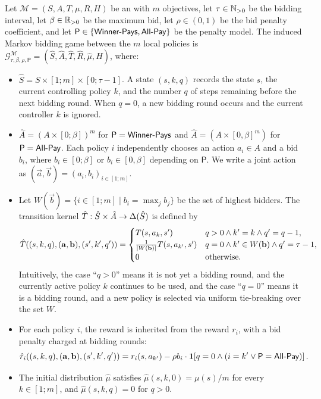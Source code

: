 \begin{definition}\label{def:markov-bidding-game}
	Let \(\mathcal{M}=(S,A,T,\mu,R,H)\) be an \momdp with \(m\) objectives, let \(\tau\in\mathbb{N}_{>0}\) be the bidding interval, let \(\beta\in\mathbb{R}_{>0}\) be the maximum bid, let \(\rho\in(0,1)\) be the bid penalty coefficient, and let \(\mathsf{P}\in\{\textsf{Winner-Pays},\textsf{All-Pay}\}\) be the penalty model.
	The induced Markov bidding game between the $m$ local policies is \(\mathcal{G}^{\mathcal{M}}_{\tau,\beta,\rho,\mathsf{P}}=(\hat S,\hat A,\hat T,\hat R,\hat\mu,H)\), where:
	\begin{itemize}
		\item \(\hat S=S\times [1;m]\times [0;\tau-1]\). A state \((s,k,q)\) records the \momdp state \(s\), the current controlling policy \(k\), and the number \(q\) of steps remaining before the next bidding round. When \(q=0\), a new bidding round occurs and the current controller \(k\) is ignored.
		\item \(\hat A=(A\times [0;\beta])^m\) for $\mathsf{P}=\textsf{Winner-Pays}$ and $\hat A=(A\times [0,\beta]^m)$ for $\mathsf{P}=\textsf{All-Pay}$. Each policy \(i\) independently chooses an action \(a_i\in A\) and a bid $b_i$, where \(b_i\in[0;\beta]\) or $b_i\in [0,\beta]$ depending on $\mathsf{P}$. We write a joint action as \((\vec a,\vec b)=(a_i,b_i)_{i\in[1;m]}\).
		\item Let \(W(\vec b)=\{i\in[1;m]\mid b_i=\max_j b_j\}\) be the set of highest bidders. The transition kernel \(\hat T:\hat S\times\hat A\to\Delta(\hat S)\) is defined by
		\begin{equation}
			\hat T((s,k,q),(\mathbf{a},\mathbf{b}),(s',k',q'))=
			\begin{cases}
				T(s,a_k,s') & q>0 \land k'=k \land q'=q-1,\\
				\frac{1}{\left|W(\mathbf{b})\right|}T(s,a_{k'},s') & q=0 \land k'\in W(\mathbf{b})\land q'=\tau-1,\\
				0 & \text{otherwise}.
			\end{cases}
		\end{equation}
		Intuitively, the case ``$q>0$'' means it is not yet a bidding round, and the currently active policy $k$ continues to be used, and the case ``$q=0$'' means it is a bidding round, and a new policy is selected via uniform tie-breaking over the set $W$.
		\item For each policy \(i\), the reward is inherited from the \momdp reward \(r_i\), with a bid penalty charged at bidding rounds:
		\begin{equation}
			\hat r_i((s,k,q),(\mathbf{a},\mathbf{b}),(s',k',q'))
			=
			r_i(s,a_{k'})
			-
			\rho b_i\cdot \mathbf{1}\!\left[q=0\land (i=k'\lor \mathsf{P}=\textsf{All-Pay})\right].
		\end{equation}
		\item The initial distribution \(\hat\mu\) satisfies \(\hat\mu(s,k,0)=\mu(s)/m\) for every \(k\in[1;m]\), and \(\hat\mu(s,k,q)=0\) for \(q>0\).
	\end{itemize}
\end{definition}
